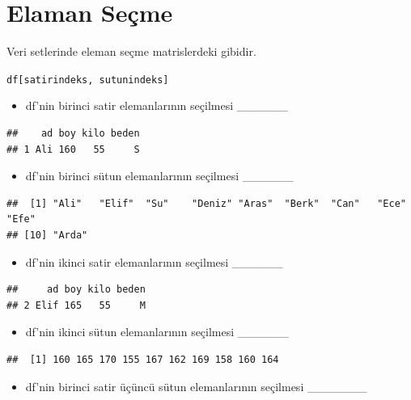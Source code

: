 \documentclass[
  oneside]{book}
\providecommand{\tightlist}{%
  \setlength{\itemsep}{0pt}\setlength{\parskip}{0pt}}
\begin{document}
\hypertarget{elaman-seuxe7me}{%
\section{Elaman Seçme}\label{elaman-seuxe7me}}

Veri setlerinde eleman seçme matrislerdeki gibidir.

\texttt{df{[}satirindeks,\ sutunindeks{]}}

\begin{itemize}
\tightlist
\item
  df'nin birinci satir elemanlarının seçilmesi \_\_\_\_\_\_
\end{itemize}

\begin{verbatim}
##    ad boy kilo beden
## 1 Ali 160   55     S
\end{verbatim}

\begin{itemize}
\tightlist
\item
  df'nin birinci sütun elemanlarının seçilmesi \_\_\_\_\_\_
\end{itemize}

\begin{verbatim}
##  [1] "Ali"   "Elif"  "Su"    "Deniz" "Aras"  "Berk"  "Can"   "Ece"   "Efe"  
## [10] "Arda"
\end{verbatim}

\begin{itemize}
\tightlist
\item
  df'nin ikinci satir elemanlarının seçilmesi \_\_\_\_\_\_
\end{itemize}

\begin{verbatim}
##     ad boy kilo beden
## 2 Elif 165   55     M
\end{verbatim}

\begin{itemize}
\tightlist
\item
  df'nin ikinci sütun elemanlarının seçilmesi \_\_\_\_\_\_
\end{itemize}

\begin{verbatim}
##  [1] 160 165 170 155 167 162 169 158 160 164
\end{verbatim}

\begin{itemize}
\tightlist
\item
  df'nin birinci satir üçüncü sütun elemanlarının seçilmesi \_\_\_\_\_\_\_
\end{itemize}
\end{document}
